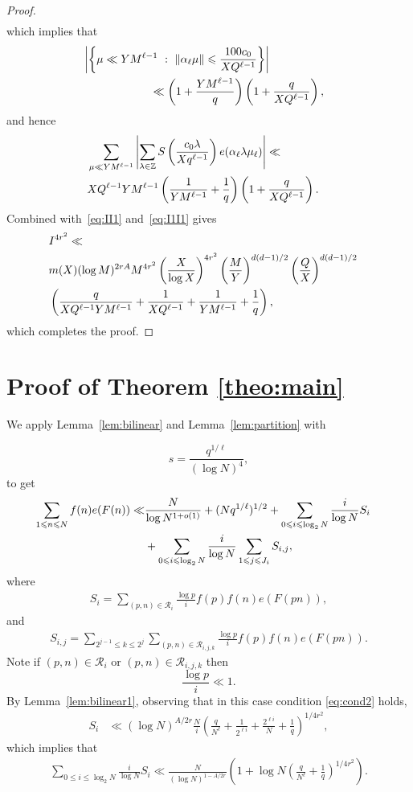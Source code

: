 \documentclass[12pt]{amsart}
\def\cR{{\mathcal R}}
\def\Z{{\mathbb Z}}
\def\\{\cr}
\def\le{\leqslant}
\begin{document}
\begin{proof}
\begin{align*}
\end{align*}
which implies that 
\begin{align*}
&\left|\left\{ \mu \ll YM^{\ell-1} \ : \ \|\alpha_{\ell}\mu\|  \le \frac{100c_0}{XQ^{\ell-1}} \right\}\right|\\ & \quad \quad \quad \quad \quad \quad \ll \left(1+\frac{YM^{\ell-1}}{q} \right)\left(1+\frac{q}{XQ^{\ell-1}}\right),
\end{align*}
and hence 
\begin{align*}
&\sum_{\mu\ll YM^{\ell-1}}\left|\sum_{\lambda \in \Z}S\left(\frac{c_0\lambda}{Xq^{\ell-1}}\right)e(\alpha_\ell \lambda \mu_\ell)\right|\ll \\ & XQ^{\ell-1}YM^{\ell-1}\left(\frac{1}{YM^{\ell-1}}+\frac{1}{q} \right)\left(1+\frac{q}{XQ^{\ell-1}}\right).
\end{align*}
Combined with~\eqref{eq:II1} and~\eqref{eq:I1I1} gives 
\begin{align*}
& I^{4r^2}\ll \\ & m(X)(\log{M})^{2rA}M^{4r^2}\left(\frac{X}{\log{X}}\right)^{4r^2} \left(\frac{M}{Y}\right)^{d(d-1)/2}\left(\frac{Q}{X}\right)^{d(d-1)/2} \\ & \left(\frac{q}{XQ^{\ell-1}YM^{\ell-1}}+\frac{1}{XQ^{\ell-1}}+\frac{1}{YM^{\ell-1}}+\frac{1}{q}\right),
\end{align*}
which completes the proof.
\end{proof}
\section{Proof of Theorem \ref{theo:main}} 
\label{s4}
 We apply Lemma~\ref{lem:bilinear} and Lemma~\ref{lem:partition} with

$$s=\frac{q^{1/\ell}}{(\log{N})^{4}},$$
 to get 
\begin{align*}
\sum_{1\le n \le N}f(n)e(F(n))\ll & \frac{N}{\log{N}^{1+o(1)}}+(Nq^{1/\ell})^{1/2}+\sum_{0\le i \le \log_2{N}}\frac{i}{\log{N}}S_i\\ & +\sum_{0\le i\le \log_2{N}}\frac{i}{\log{N}}\sum_{1\le j \le J_i}S_{i,j},
\end{align*}
where 
\begin{align*}
S_i=\sum_{(p,n)\in \cR_i}\frac{\log{p}}{i}f(p)f(n)e(F(pn)),
\end{align*}
and 
\begin{align*}
S_{i,j}=\sum_{2^{j-1}\le k \le 2^{j}}\sum_{(p,n)\in \cR_{i,j,k}}\frac{\log{p}}{i}f(p)f(n)e(F(pn)).
\end{align*}
Note if $(p,n)\in \cR_i$ or $(p,n)\in \cR_{i,j,k}$ then 
$$\frac{\log{p}}{i}\ll 1.$$
By Lemma~\ref{lem:bilinear1}, observing that in this case condition \eqref{eq:cond2} holds,
\begin{align*}
S_i&\ll (\log{N})^{A/2r}\frac{N}{i}\left(\frac{q}{N^{\ell}}+\frac{1}{2^{\ell i}}+\frac{2^{\ell i }}{N}+\frac{1}{q}\right)^{1/4r^2},
\end{align*}
which implies that 
\begin{align}
\label{eq:Sib}
\sum_{0\le i \le \log_2{N}}\frac{i}{\log{N}}S_i\ll \frac{N}{(\log{N})^{1-A/2r}}\left(1+\log{N}\left(\frac{q}{N^{\ell}}+\frac{1}{q}\right)^{1/4r^2}\right).\end{align}
\end{document}
